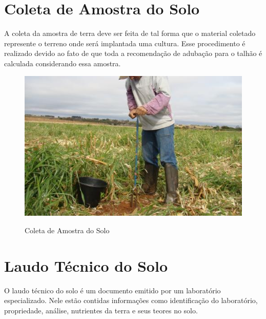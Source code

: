 
\begin{anexosenv}
\partanexos

\chapter{Coleta de Amostra do Solo}
\label{chap:anexoColeta}

A coleta da amostra de terra deve ser feita de tal forma que o material coletado represente o terreno onde será implantada uma cultura. Esse procedimento é realizado devido ao fato de que toda a recomendação de adubação para o talhão é calculada considerando essa amostra.

\begin{figure}[H]
    \centering
    \caption{Coleta de Amostra do Solo}
    \includegraphics[width=13cm]{./dados/figuras/coleta_de_amostra_do_solo.jpg}
    \label{fig:coletadeamostra}
\end{figure}

\chapter{Laudo Técnico do Solo}
\label{chap:laudodosolo}

O laudo técnico do solo é um documento emitido por um laboratório especializado. Nele estão contidas informações como identificação do laboratório, propriedade, análise, nutrientes da terra e seus teores no solo.


\end{anexosenv}
